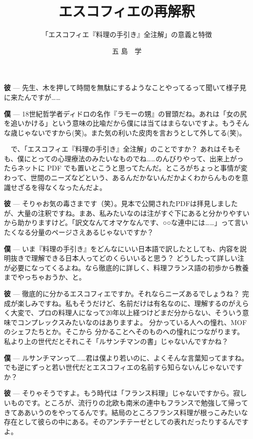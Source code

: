 \documentclass[14Q,]{ltjsbook}
\title{エスコフィエの再解釈}
\subtitle{「エスコフィエ『料理の手引き』全注解」の意義と特徴}
\author{五 島　学}
\date{}
\renewcommand{\ldots}{\noindent…}
\renewcommand{\kenten}[1]{#1}
\begin{document}
\maketitle

\LARGE

\textbf{彼} ---
先生、木を押して時間を無駄にするようなことやってるって聞いて様子見に来たんですが\ldots{}\ldots{}

\textbf{僕} ---
18世紀哲学者ディドロの名作『ラモーの甥』の冒頭だね。あれは「女の尻を追いかける」という意味の比喩だから僕には当てはまらないですよ。もうそんな歳じゃないですから(笑)。また気の利いた皮肉を言おうとして外してる(笑)。

　で、「エスコフィエ『料理の手引き』全注解」のことですか？
あれはそもそも、僕にとっての心理療法のみたいなものでね\ldots{}\ldots{}のんびりやって、出来上がったらネットに
PDF
でも置いとこうと思ってたんだ。ところがちょっと事情が変わって、世間のニーズなどという、あるんだかないんだかよくわからんものを意識せざるを得なくなったんだよ。

\textbf{彼} ---
そりゃお気の毒さまです（笑）。見本で公開されたPDFは拝見しましたが、大量の注釈ですね。まあ、私みたいなのは注がすぐ下にあると分かりやすいから助かりますけど。「訳文なんてオマケなんです、○○な連中には\ldots{}\ldots{}」って言いたくなる分量のページさえあるじゃないですか？

\textbf{僕} ---
いま『料理の手引き』をどんなにいい日本語で訳したとしても、内容を説明抜きで理解できる日本人ってどのくらいいると思う？
どうしたって詳しい注が必要になってくるよね。なら徹底的に詳しく、料理フランス語の初歩から\kenten{教養}までやっちゃおうか、と。

\textbf{彼} ---
\kenten{徹底的に分かる}エスコフィエですか。それならニーズあるでしょうね？
完成が楽しみですね。私もそうだけど、名前だけは有名なのに、理解するのがえらく大変で、プロの料理人になって20年以上経つけどまだ分からない、そういう意味でコンプレックスみたいなのはありますよ。
\kenten{分かっている人への憧れ}、MOFのシェフたちとか。そこから
\kenten{分かることへそのものへの憧れ}につながります。私より上の世代だとそれこそ「ルサンチマンの書」じゃないんですかね？

\textbf{僕} ---
ルサンチマンって\ldots{}\ldots{}君は僕より若いのに、よくそんな言葉知ってますね。でも逆にずっと若い世代だとエスコフィエの名前すら知らないんじゃないですか？

\textbf{彼} ---
そりゃそうですよ。もう時代は「フランス料理」じゃないですから。寂しいものです。ところが、流行りの北欧も南米の連中もフランスで勉強して帰ってきてああいうのをやってるんです。結局のところフランス料理が根っこみたいな存在として彼らの中にある。そのアンチテーゼとしての表れだったりするんですよ。
\end{document}
